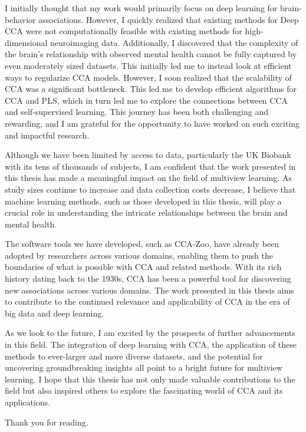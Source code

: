 I initially thought that my work would primarily focus on deep learning for brain-behavior associations. However, I quickly realized that existing methods for Deep CCA were not computationally feasible with existing methods for high-dimensional neuroimaging data. Additionally, I discovered that the complexity of the brain's relationship with observed mental health cannot be fully captured by even moderately sized datasets. This initially led me to instead look at efficient ways to regularize CCA models. However, I soon realized that the scalability of CCA was a significant bottleneck. This led me to develop efficient algorithms for CCA and PLS, which in turn led me to explore the connections between CCA and self-supervised learning. This journey has been both challenging and rewarding, and I am grateful for the opportunity to have worked on such exciting and impactful research.

Although we have been limited by access to data, particularly the UK Biobank with its tens of thousands of subjects, I am confident that the work presented in this thesis has made a meaningful impact on the field of multiview learning. As study sizes continue to increase and data collection costs decrease, I believe that machine learning methods, such as those developed in this thesis, will play a crucial role in understanding the intricate relationships between the brain and mental health.

The software tools we have developed, such as CCA-Zoo, have already been adopted by researchers across various domains, enabling them to push the boundaries of what is possible with CCA and related methods. With its rich history dating back to the 1930s, CCA has been a powerful tool for discovering new associations across various domains. The work presented in this thesis aims to contribute to the continued relevance and applicability of CCA in the era of big data and deep learning.

As we look to the future, I am excited by the prospects of further advancements in this field. The integration of deep learning with CCA, the application of these methods to ever-larger and more diverse datasets, and the potential for uncovering groundbreaking insights all point to a bright future for multiview learning. I hope that this thesis has not only made valuable contributions to the field but also inspired others to explore the fascinating world of CCA and its applications.

Thank you for reading.